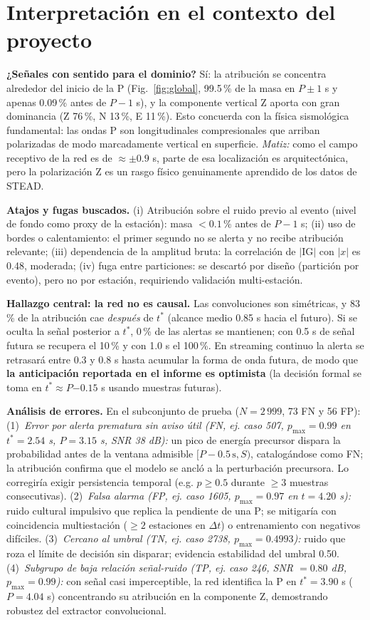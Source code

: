 \documentclass[10pt,letterpaper]{article}
\newcommand{\vAfter}{83\,\%}          %
\newcommand{\vReach}{0.85 s}           %
\newcommand{\vKeptZero}{0\,\%}        %
\newcommand{\vKeptHalf}{10\,\%}       %
\newcommand{\vKeptOne}{100\,\%}       %
\newcommand{\vZ}{76\,\%}\newcommand{\vN}{13\,\%}\newcommand{\vE}{11\,\%}
\newcommand{\vAmp}{0.48}              %
\newcommand{\vLag}{$-0.15$ s}         %
\begin{document}
\section{Interpretación en el contexto del proyecto}
\textbf{¿Señales con sentido para el dominio?} Sí: la atribución se concentra alrededor del inicio de la P (Fig.~\ref{fig:global}, 99.5\,\% de la masa en $P \pm 1$ s y apenas 0.09\,\% antes de $P-1$ s), y la componente vertical Z aporta con gran dominancia (Z \vZ{}, N \vN{}, E \vE{}). Esto concuerda con la física sismológica fundamental: las ondas P son longitudinales compresionales que arriban polarizadas de modo marcadamente vertical en superficie. \emph{Matiz:} como el campo receptivo de la red es de $\approx\pm0.9$ s, parte de esa localización es arquitectónica, pero la polarización Z es un rasgo físico genuinamente aprendido de los datos de STEAD.

\textbf{Atajos y fugas buscados.} (i) Atribución sobre el ruido previo al evento (nivel de fondo como proxy de la estación): masa $<0.1$\,\% antes de $P-1$ s; (ii) uso de bordes o calentamiento: el primer segundo no se alerta y no recibe atribución relevante; (iii) dependencia de la amplitud bruta: la correlación de $|\mathrm{IG}|$ con $|x|$ es \vAmp{}, moderada; (iv) fuga entre particiones: se descartó por diseño (partición por evento), pero no por estación, requiriendo validación multi-estación.

\textbf{Hallazgo central: la red no es causal.} Las convoluciones son simétricas, y \vAfter{} de la atribución cae \emph{después} de $t^\ast$ (alcance medio \vReach{} hacia el futuro). Si se oculta la señal posterior a $t^\ast$, \vKeptZero{} de las alertas se mantienen; con 0.5 s de señal futura se recupera el \vKeptHalf{} y con 1.0 s el \vKeptOne{}. En streaming continuo la alerta se retrasará entre 0.3 y 0.8 s hasta acumular la forma de onda futura, de modo que \textbf{la anticipación reportada en el informe es optimista} (la decisión formal se toma en $t^\ast\approx P$\vLag{} usando muestras futuras).

\textbf{Análisis de errores.} En el subconjunto de prueba ($N=2\,999$, 73 FN y 56 FP):
(1)~\emph{Error por alerta prematura sin aviso útil (FN, ej. caso 507, $p_{\max}=0.99$ en $t^\ast=2.54$ s, $P=3.15$ s, SNR 38 dB):} un pico de energía precursor dispara la probabilidad antes de la ventana admisible $[P-0.5\,\mathrm{s}, S)$, catalogándose como FN; la atribución confirma que el modelo se ancló a la perturbación precursora. Lo corregiría exigir persistencia temporal (e.g. $p \ge 0.5$ durante $\ge 3$ muestras consecutivas).
(2)~\emph{Falsa alarma (FP, ej. caso 1605, $p_{\max}=0.97$ en $t=4.20$ s):} ruido cultural impulsivo que replica la pendiente de una P; se mitigaría con coincidencia multiestación ($\ge 2$ estaciones en $\Delta t$) o entrenamiento con negativos difíciles.
(3)~\emph{Cercano al umbral (TN, ej. caso 2738, $p_{\max}=0.4993$):} ruido que roza el límite de decisión sin disparar; evidencia estabilidad del umbral 0.50.
(4)~\emph{Subgrupo de baja relación señal-ruido (TP, ej. caso 246, SNR $=0.80$ dB, $p_{\max}=0.99$):} con señal casi imperceptible, la red identifica la P en $t^\ast=3.90$ s ($P=4.04$ s) concentrando su atribución en la componente Z, demostrando robustez del extractor convolucional.
\end{document}
